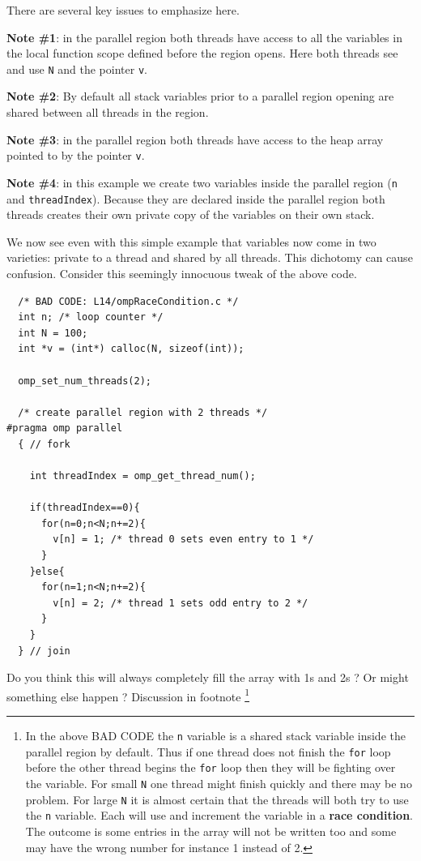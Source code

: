 There are several key issues to emphasize here.

{\bf Note \#1}: in the parallel region both threads have access to all the variables in the local function scope defined before the region opens. Here both threads see and use \texttt{N} and the pointer \texttt{v}. 

{\bf Note \#2}: By default all stack variables prior to a parallel region opening are shared between all threads in the region.

{\bf Note \#3}: in the parallel region both threads have access to the heap array pointed to by the pointer \texttt{v}. 

{\bf Note \#4}: in this example we create two variables inside the parallel region (\texttt{n} and \texttt{threadIndex}). Because they are declared inside the parallel region both threads creates their own private copy of the variables on their own stack.

We now see even with this simple example that variables now come in two varieties: private to a thread and shared by all threads. This dichotomy can cause confusion. Consider this seemingly innocuous tweak of the above code.

\begin{verbatim}
  /* BAD CODE: L14/ompRaceCondition.c */
  int n; /* loop counter */
  int N = 100;
  int *v = (int*) calloc(N, sizeof(int));

  omp_set_num_threads(2);

  /* create parallel region with 2 threads */
#pragma omp parallel
  { // fork
  
    int threadIndex = omp_get_thread_num();

    if(threadIndex==0){
      for(n=0;n<N;n+=2){
        v[n] = 1; /* thread 0 sets even entry to 1 */
      }
    }else{
      for(n=1;n<N;n+=2){
        v[n] = 2; /* thread 1 sets odd entry to 2 */
      }
    }
  } // join     
\end{verbatim}

Do you think this will always completely fill the array with 1s and 2s ? Or might something else happen ? Discussion in footnote \footnote{In the above BAD CODE the \texttt{n} variable is a shared stack variable inside the parallel region by default. Thus if one thread does not finish the \texttt{for} loop before the other thread begins the \texttt{for} loop then they will be fighting over the variable. For small \texttt{N} one thread might finish quickly and there may be no problem. For large \texttt{N} it is almost certain that the threads will both try to use the \texttt{n} variable. Each will use and increment the variable in a {\bf race condition}. The outcome is some entries in the array will not be written too and some may have the wrong number for instance 1 instead of 2.}

